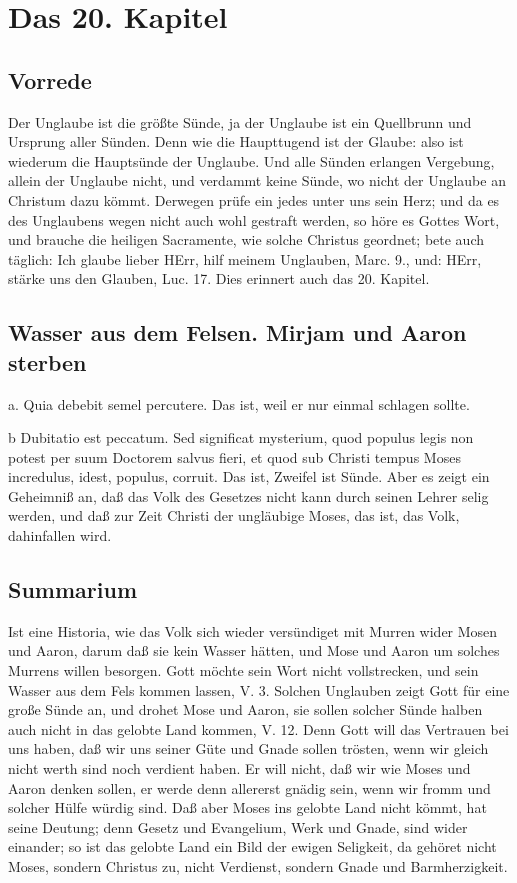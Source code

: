 \chapter{Das 20. Kapitel}

\section{Vorrede}

Der Unglaube ist die größte Sünde, ja der Unglaube ist ein Quellbrunn und Ursprung aller Sünden. Denn wie die Haupttugend ist der Glaube: also ist wiederum die Hauptsünde der Unglaube. Und alle Sünden erlangen Vergebung, allein der Unglaube nicht, und verdammt keine Sünde, wo nicht der Unglaube an Christum dazu kömmt. Derwegen prüfe ein jedes unter uns sein Herz; und da es des Unglaubens wegen nicht auch wohl gestraft werden, so höre es Gottes Wort, und brauche die heiligen Sacramente, wie solche Christus geordnet; bete auch täglich: Ich glaube lieber HErr, hilf meinem Unglauben, Marc. 9., und: HErr, stärke uns den Glauben, Luc. 17. Dies erinnert auch das 20. Kapitel.

\section{Wasser aus dem Felsen. Mirjam und Aaron sterben}

a. Quia debebit semel percutere. Das ist, weil er nur einmal schlagen sollte.

b Dubitatio est peccatum. Sed significat mysterium, quod populus legis non potest per suum Doctorem salvus fieri, et quod sub Christi tempus Moses incredulus, idest, populus, corruit. Das ist, Zweifel ist Sünde. Aber es zeigt ein Geheimniß an, daß das Volk des Gesetzes nicht kann durch seinen Lehrer selig werden, und daß zur Zeit Christi der ungläubige Moses, das ist, das Volk, dahinfallen wird.

\section{Summarium}

Ist eine Historia, wie das Volk sich wieder versündiget mit Murren wider Mosen und Aaron, darum daß sie kein Wasser hätten, und Mose und Aaron um solches Murrens willen besorgen. Gott möchte sein Wort nicht vollstrecken, und sein Wasser aus dem Fels kommen lassen, V. 3. Solchen Unglauben zeigt Gott für eine große Sünde an, und drohet Mose und Aaron, sie sollen solcher Sünde halben auch nicht in das gelobte Land kommen, V. 12. Denn Gott will das Vertrauen bei uns haben, daß wir uns seiner Güte und Gnade sollen trösten, wenn wir gleich nicht werth sind noch verdient haben. Er will nicht, daß wir wie Moses und Aaron denken sollen, er werde denn allererst gnädig sein, wenn wir fromm und solcher Hülfe würdig sind. Daß aber Moses ins gelobte Land nicht kömmt, hat seine Deutung; denn Gesetz und Evangelium, Werk und Gnade, sind wider einander; so ist das gelobte Land ein Bild der ewigen Seligkeit, da gehöret nicht Moses, sondern Christus zu, nicht Verdienst, sondern Gnade und Barmherzigkeit.

